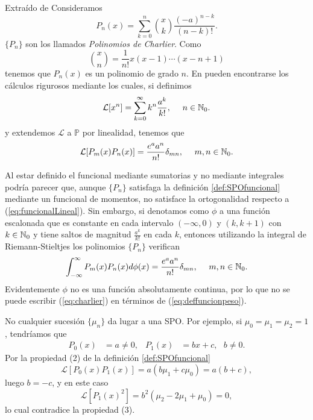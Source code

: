 \begin{ejemplo}
    Extraído de \cite[Capítulo 1, sección 1]{chihara}
    Consideramos 
    $$
    P_n(x) = \sum_{k=0}^n\binom{x}{k}\dfrac{(-a)^{n-k}}{(n-k)!}.
    $$
    $\{P_n\}$ son los llamados \textit{Polinomios de Charlier}. Como
    $$\binom{x}{n} = \dfrac 1 {n!} x(x-1)\cdots (x-n+1) 
    $$
    tenemos que $P_n(x)$ es un polinomio de grado $n$. En \cite{chihara} pueden encontrarse los cálculos rigurosos mediante los cuales, si definimos
    $$
    \mathcal{L}[x^n]=\sum_{k=0}^\infty k^n \dfrac{a^k}{k!}, \ \ \ \ n\in\mathbb{N}_0.
    $$
    y extendemos $\mathcal{L}$ a $\mathbb{P}$ por linealidad, tenemos que 
    $$
    \mathcal{L}[P_m(x)P_n(x)] = \dfrac{e^a a^n}{n!}\delta_{mn}, \ \ \ \ m,n\in\mathbb{N}_0.
    $$

    Al estar definido el funcional mediante sumatorias y no mediante integrales podría parecer que, aunque $\{P_n\}$ satisfaga la definición \ref{def:SPOfuncional} mediante un funcional de momentos, no satisface la ortogonalidad respecto a (\ref{eq:funcionalLineal}). Sin embargo, si denotamos como $\phi$ a una función escalonada que es constante en cada intervalo $(-\infty,0)$ y $(k,k+1)$ con $k\in\mathbb{N}_0$ y tiene saltos de magnitud $\frac{a^k}{k!}$ en cada $k$, entonces utilizando la integral de Riemann-Stieltjes los polinomios $\{P_n\}$ verifican
    \begin{equation}
        \label{eq:charlier}
        \int_{-\infty}^\infty P_m(x)P_n(x) d\phi(x) = \dfrac{e^a a^n}{n!}\delta_{mn}, \ \ \ \ m,n\in\mathbb{N}_0.        
    \end{equation}
    Evidentemente $\phi$ no es una función absolutamente continua, por lo que no se puede escribir (\ref{eq:charlier}) en términos de (\ref{eq:deffuncionpeso}).
\end{ejemplo}

\begin{observacion}
    \label{observacion:existencia}
    No cualquier sucesión $\{\mu_n\}$ da lugar a una SPO. Por ejemplo, si $\mu_0=\mu_1=\mu_2=1$, tendríamos que
    \begin{align*}
        P_0(x)&=a\not=0, & P_1(x)&=bx+c, \ \ \ b\not=0.
    \end{align*}
    Por la propiedad (2) de la definición \ref{def:SPOfuncional}
    $$
    \mathcal{L}[P_0(x)P_1(x)] = a(b\mu_1 + c\mu_0)=a(b+c),
    $$
    luego $b=-c$, y en este caso
    $$
    \mathcal{L}[P_1(x)^2] = b^2(\mu_2-2\mu_1+\mu_0)=0,
    $$
    lo cual contradice la propiedad (3).
\end{observacion}

